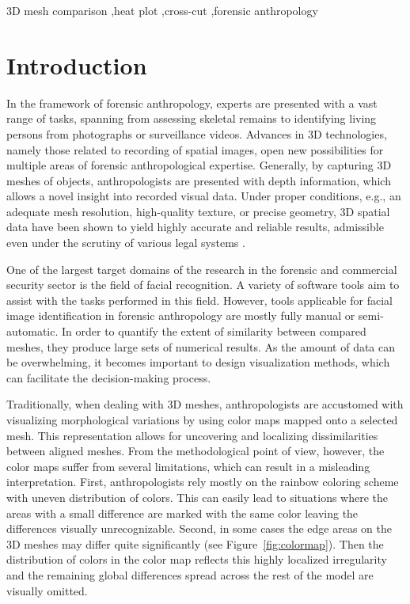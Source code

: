 \documentclass[final,5p,times]{elsarticle}
\begin{document}
\begin{frontmatter}
\begin{keyword}
3D mesh comparison \sep heat plot \sep cross-cut \sep forensic anthropology

\end{keyword}

\end{frontmatter}




\section{Introduction}
In the framework of forensic anthropology, experts are presented with a vast range of tasks, spanning from assessing skeletal remains to identifying living persons from photographs or surveillance videos. 
Advances in 3D technologies, namely those related to recording of spatial images, open new possibilities for multiple areas of forensic anthropological expertise.
Generally, by capturing 3D meshes of objects, anthropologists are presented with depth information, which allows a novel insight into recorded visual data. 
Under proper conditions, e.g., an adequate mesh resolution, high-quality texture, or precise geometry, 3D spatial data have been shown to yield highly accurate and reliable results, admissible even under the scrutiny of various legal systems \cite{urbanova2015testing}.

One of the largest target domains of the research in the forensic and commercial security sector is the field of facial recognition. 
A variety of software tools aim to assist with the tasks performed in this field.
However, tools applicable for facial image identification in forensic anthropology are mostly fully manual or semi-automatic.
In order to quantify the extent of similarity between compared meshes, they produce large sets of numerical results. 
As the amount of data can be overwhelming, it becomes important to design visualization methods, which can facilitate the decision-making process.

Traditionally, when dealing with 3D meshes, anthropologists are accustomed with visualizing morphological variations by using color maps mapped onto a selected mesh.
This representation allows for uncovering and localizing dissimilarities between aligned meshes. 
From the methodological point of view, however, the color maps suffer from several limitations, which can result in a misleading interpretation.
First, anthropologists rely mostly on the rainbow coloring scheme with uneven distribution of colors. 
This can easily lead to situations where the areas with a small difference are marked with the same color leaving the differences visually unrecognizable.
Second, in some cases the edge areas on the 3D meshes may differ quite significantly (see Figure~\ref{fig:colormap}).
Then the distribution of colors in the color map reflects this highly localized irregularity and the remaining global differences spread across the rest of the model are visually omitted.
\end{document}
